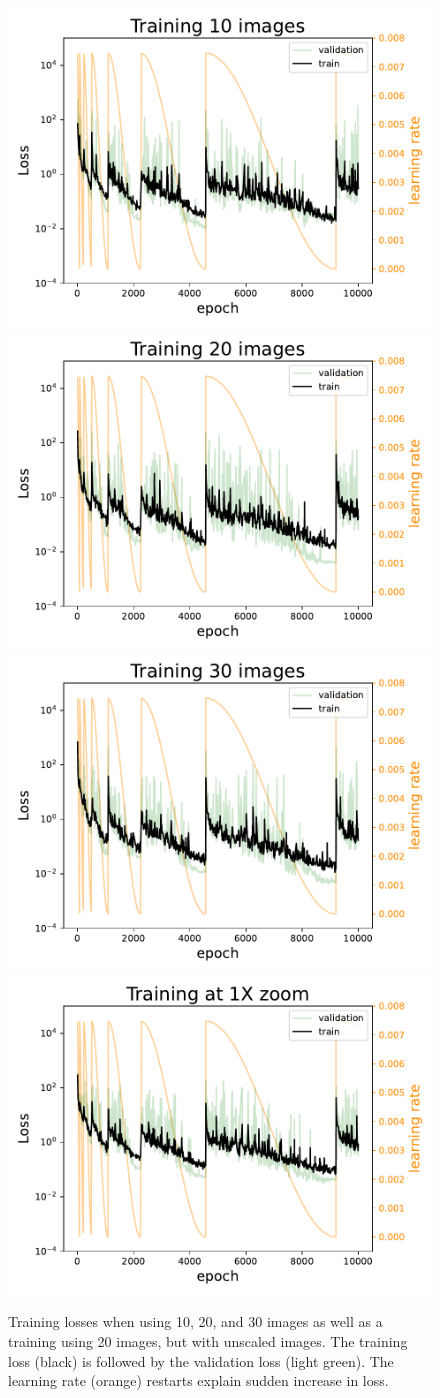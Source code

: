 \begin{figure}
    \centering
    \includegraphics[width=0.48\linewidth]{skinstression/images/training/Training_10_images.pdf}
    \includegraphics[width=0.48\linewidth]{skinstression/images/training/Training_20_images.pdf} \\
    \includegraphics[width=0.48\linewidth]{skinstression/images/training/Training_30_images.pdf}
    \includegraphics[width=0.48\linewidth]{skinstression/images/training/Training_at_1X_zoom.pdf}
    \caption[Training losses]{
        Training losses when using 10, 20, and 30 images as well as a training using 20 images, but with unscaled images.
        The training loss (black) is followed by the validation loss (light green).
        The learning rate (orange) restarts explain sudden increase in loss.
    }
    \label{fig:skinstression-training}
\end{figure}

